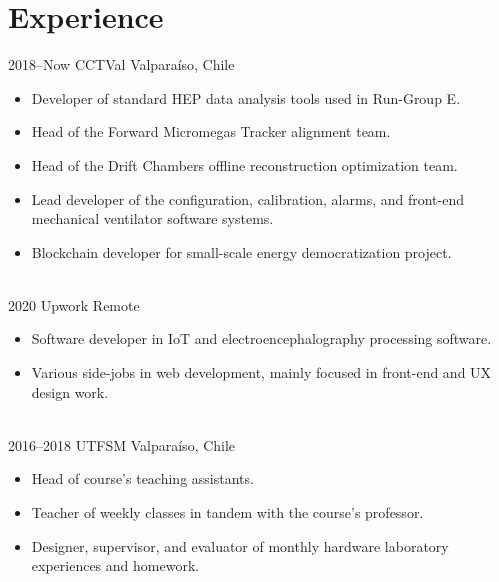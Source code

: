 \documentclass[a4paper]{cv-style}
\begin{document}
\section{Experience}
    \begin{entrylist}
        \entry
            {2018--Now}
            {CCTVal}
            {Valpara\'iso, Chile}
            {
            \begin{itemize}
                \item Developer of standard HEP data analysis tools used in Run-Group E.
                \item Head of the Forward Micromegas Tracker alignment team.
                \item Head of the Drift Chambers offline reconstruction optimization team.
                \item Lead developer of the configuration, calibration, alarms, and front-end mechanical ventilator software systems.
                \item Blockchain developer for small-scale energy democratization project.
            \end{itemize}} \\
        \entry
            {2020}
            {Upwork}
            {Remote}
            {
            \begin{itemize}
                \item Software developer in IoT and electroencephalography processing software.
                \item Various side-jobs in web development, mainly focused in front-end and UX design work.
            \end{itemize}} \\
        \entry
            {2016--2018}
            {UTFSM}
            {Valpara\'iso, Chile}
            {
            \begin{itemize}
                \item Head of course's teaching assistants.
                \item Teacher of weekly classes in tandem with the course's professor.
                \item Designer, supervisor, and evaluator of monthly hardware laboratory experiences and homework.
            \end{itemize}}
    \end{entrylist}
\end{document}
